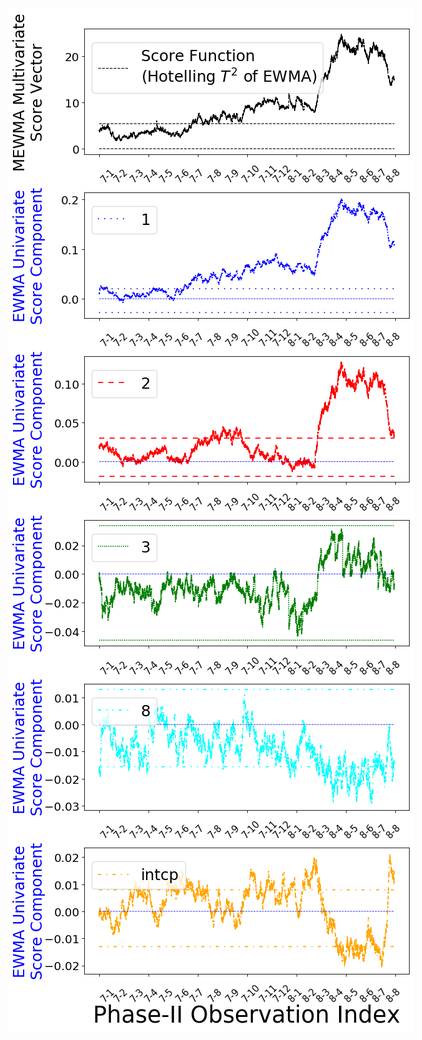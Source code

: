 \documentclass[twoside,11pt]{article}
\begin{document}
\begin{figure}[!htbp]
\centering
 \includegraphics[width = 0.48\linewidth]{../figures/v14/credit_default/logi_scal_train_PI/PII_pos_single_credit_mlines_with_regu_1e-08_0_0001_0_001_99_0.png}

\end{figure}
\end{document}
